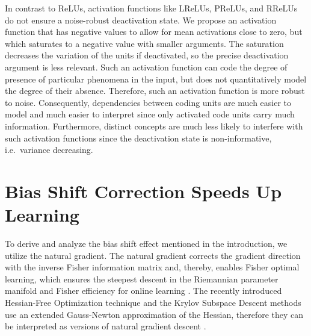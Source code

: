 \documentclass{article}
\begin{document}
In contrast to ReLUs, activation functions like
LReLUs, PReLUs, and RReLUs do not
ensure a noise-robust deactivation state.
We propose an activation function that has negative
values to allow for mean activations close to zero,
but which saturates to a negative value with smaller arguments.
The saturation decreases the variation of the units if
deactivated, so the precise deactivation argument is less relevant.
Such an activation function can code the degree of presence of
particular phenomena in the input, but does
not quantitatively model the degree of their absence.
Therefore, such an activation function is more robust to noise.
Consequently, dependencies between
coding units are much easier to model and much easier to interpret
since only activated code units carry much information.
Furthermore, distinct concepts are much less likely to interfere with
such activation functions since the deactivation state is
non-informative, i.e.\ variance decreasing.

\section{Bias Shift Correction Speeds Up Learning}
\label{sec:naturalGradient}
To derive and analyze the bias shift effect mentioned in
the introduction, we utilize the natural gradient.
The natural gradient corrects the gradient direction with
the inverse Fisher information matrix and, thereby, enables
Fisher optimal learning, which ensures
the steepest descent in the Riemannian parameter manifold
and Fisher efficiency for online learning \citep{Amari:98}.
The recently introduced Hessian-Free Optimization
technique \citep{Martens:10}
and the Krylov Subspace Descent methods \citep{Vinyals:12}
use an extended Gauss-Newton approximation of the Hessian,
therefore they can be interpreted as versions of natural
gradient descent \citep{Pascanu:14}.
\end{document}
